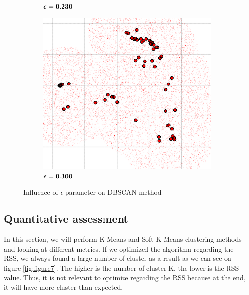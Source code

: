 \begin{figure} [ht]
\begin{subfigure}[h]{0.30\textwidth}
	\caption{$\boldsymbol \epsilon \bf = 0.230$}
    \end{subfigure}
    \begin{subfigure}[h]{0.30\textwidth}
    \centering
    \includegraphics[height=0.08\textheight]{./clustering/dbs_scan_eps_0300_min_3.png}
	\caption{$\boldsymbol \epsilon \bf = 0.300$}
    \end{subfigure}

\caption{Influence of $\epsilon$ parameter on DBSCAN method}
\label{fig:figure6}
\end{figure}

\subsection{Quantitative assessment}

In this section, we will perform K-Means and Soft-K-Means clustering methods and looking at different metrics. If we optimized the algorithm regarding the RSS, we always found a large number of cluster as a result as we can see on figure \ref{fig:figure7}. The higher is the number of cluster K, the lower is the RSS value. Thus, it is not relevant to optimize regarding the RSS because at the end, it will have more cluster than expected. 

